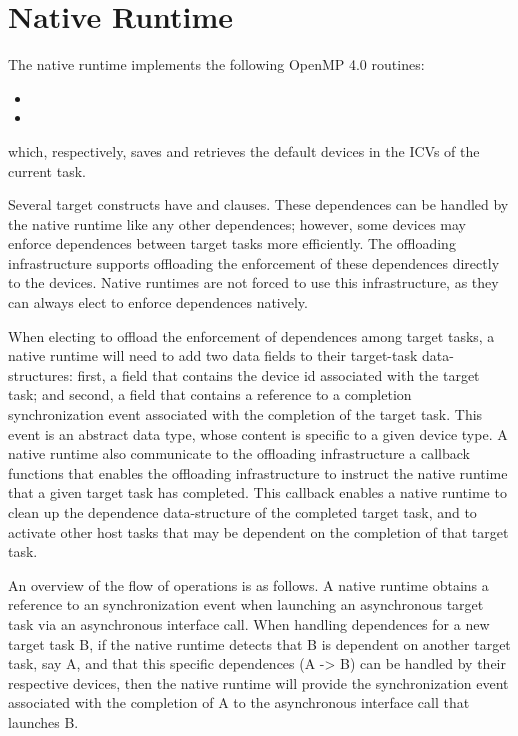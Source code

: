 \section{Native Runtime}

The native runtime implements the following OpenMP 4.0 routines:

\begin{itemize}
  \item {}

  \item {}
\end{itemize}

which, respectively, saves and retrieves the default devices in the ICVs of the current task.

Several target constructs have  and  clauses. These dependences can be handled by the native runtime like any other dependences; however, some devices may enforce dependences between target tasks more efficiently. The offloading infrastructure supports offloading the enforcement of these dependences directly to the devices. Native runtimes are not forced to use this infrastructure, as they can always elect to enforce dependences natively.

When electing to offload the enforcement of dependences among target tasks, a native runtime will need to add two data fields to their target-task data-structures: first,  a field that contains the device id associated with the target task; and second, a field that contains a reference to a completion synchronization event associated with the completion of the target task. This event is an abstract data type, whose content is specific to a given device type. A native runtime also communicate to the offloading infrastructure a callback functions that enables the offloading infrastructure to instruct the native runtime that a given target task has completed. This callback enables a native runtime to clean up the dependence data-structure of the completed target task, and to activate other host tasks that may be dependent on the completion of that target task.

An overview of the flow of operations is as follows. A native runtime obtains a reference to an synchronization event when launching an asynchronous target task via an asynchronous  interface call. When handling dependences for a new target task B, if the native runtime detects that B is dependent on another target task, say A, and that this specific dependences (A -> B) can be handled by their respective devices, then the native runtime will provide the synchronization event associated with the completion of A to the asynchronous  interface call that launches B.
